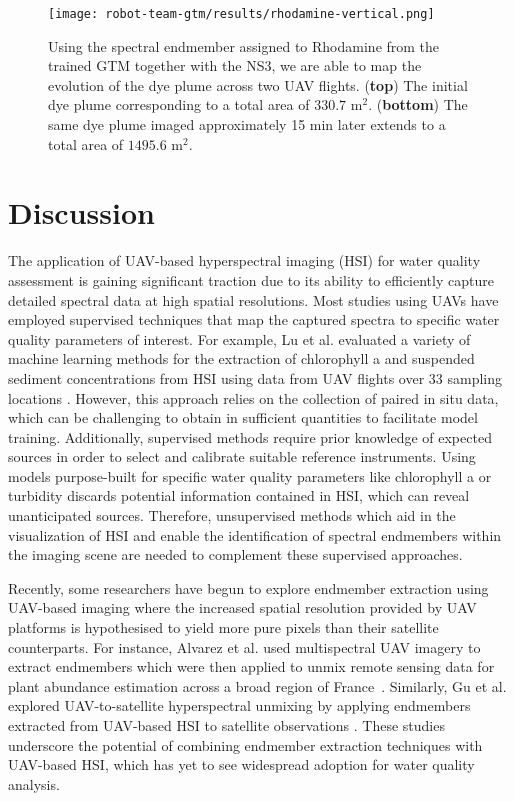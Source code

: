 \begin{figure}[H]
  \vspace{-1cm}
  \centering
  \texttt{[image: robot-team-gtm/results/rhodamine-vertical.png]}
  \caption{Using the spectral endmember assigned to Rhodamine from the trained
    GTM together with the NS3, we are able to map the evolution of the dye plume
    across two UAV flights. (\textbf{top}) The initial dye plume corresponding
    to a total area of $330.7$ m$^2$. (\textbf{bottom}) The same dye plume
    imaged approximately 15 min later extends to a total area of $1495.6$
    m$^2$.}
  \label{fig:rhodamine-map}
\end{figure}

\clearpage
\newpage



\section{Discussion}

The application of UAV-based hyperspectral imaging (HSI) for water quality
assessment is gaining significant traction due to its ability to efficiently
capture detailed spectral data at high spatial resolutions. Most studies using
UAVs have employed supervised techniques that map the captured spectra to
specific water quality parameters of interest. For example, Lu et al. evaluated
a variety of machine learning methods for the extraction of chlorophyll a and
suspended sediment concentrations from HSI using data from UAV flights over 33
sampling locations \cite{lu2021retrieval}. However, this approach relies on the
collection of paired in situ data, which can be challenging to obtain in
sufficient quantities to facilitate model training. Additionally, supervised
methods require prior knowledge of expected sources in order to select and
calibrate suitable reference instruments. Using models purpose-built for
specific water quality parameters like chlorophyll a or turbidity discards
potential information contained in HSI, which can reveal unanticipated sources.
Therefore, unsupervised methods which aid in the visualization of HSI and enable
the identification of spectral endmembers within the imaging scene are needed to
complement these supervised approaches.

Recently, some researchers have begun to explore endmember extraction using
UAV-based imaging where the increased spatial resolution provided by UAV
platforms is hypothesised to yield more pure pixels than their satellite
counterparts. For instance, Alvarez et al. used multispectral UAV imagery to
extract endmembers which were then applied to unmix remote sensing data for
plant abundance estimation across a broad region of
France~\cite{alvarez2020can}. Similarly, Gu et al. explored UAV-to-satellite
hyperspectral unmixing by applying endmembers extracted from UAV-based HSI to
satellite observations \cite{gu2023intrinsic}. These studies underscore the
potential of combining endmember extraction techniques with UAV-based HSI, which
has yet to see widespread adoption for water quality analysis.

